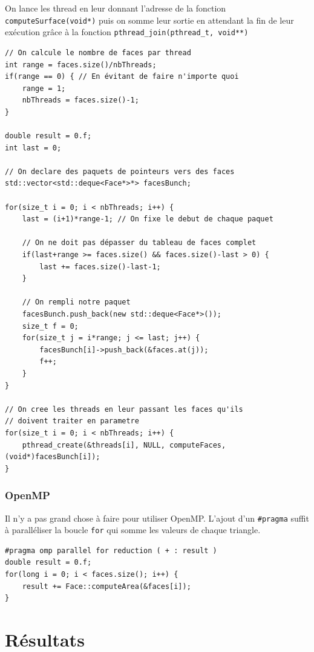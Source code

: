 \documentclass[a4paper]{article}
\begin{document}
		On lance les thread en leur donnant l'adresse de la fonction \texttt{computeSurface(void*)} puis on somme leur sortie en attendant la fin de leur exécution grâce à la fonction \texttt{pthread\_join(pthread\_t, void**)}
		\begin{lstlisting}
// On calcule le nombre de faces par thread
int range = faces.size()/nbThreads;
if(range == 0) { // En évitant de faire n'importe quoi
	range = 1;
	nbThreads = faces.size()-1;
}

double result = 0.f;
int last = 0;

// On declare des paquets de pointeurs vers des faces
std::vector<std::deque<Face*>*> facesBunch;

for(size_t i = 0; i < nbThreads; i++) {
    last = (i+1)*range-1; // On fixe le debut de chaque paquet

	// On ne doit pas dépasser du tableau de faces complet
    if(last+range >= faces.size() && faces.size()-last > 0) {
        last += faces.size()-last-1;
    }

	// On rempli notre paquet
    facesBunch.push_back(new std::deque<Face*>());
    size_t f = 0;
    for(size_t j = i*range; j <= last; j++) {
        facesBunch[i]->push_back(&faces.at(j));
        f++;
    }
}

// On cree les threads en leur passant les faces qu'ils
// doivent traiter en parametre
for(size_t i = 0; i < nbThreads; i++) {
    pthread_create(&threads[i], NULL, computeFaces, (void*)facesBunch[i]);
}
		\end{lstlisting}

		\subsubsection{OpenMP}
		Il n'y a pas grand chose à faire pour utiliser OpenMP. L'ajout d'un \texttt{\#pragma} suffit à paralléliser la boucle \texttt{for} qui somme les valeurs de chaque triangle.
		\begin{lstlisting}
#pragma omp parallel for reduction ( + : result )
double result = 0.f;
for(long i = 0; i < faces.size(); i++) {
    result += Face::computeArea(&faces[i]);
}
		\end{lstlisting}
\newpage
\section{Résultats}
\end{document}
